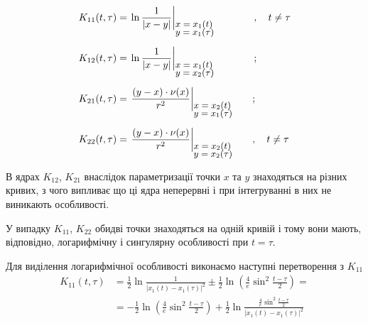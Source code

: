 \documentclass[14pt,a4paper]{extarticle}
\newcounter{e}
\numberwithin{equation}{section}
\begin{document}
$$
	\begin{array}{l}
		\displaystyle
		K_{11}(t, \tau) = \left.
			 \ln{\frac{1}{\abs{x - y}}}
		\right|_{
			{\small \parbox{20mm}{$ x = x_1(t)$ \\[-3pt] $y = x_1 ({\tau})$}}
		} \quad \quad, \quad t \neq \tau
		\\ [0.8cm]
		
		\displaystyle
		K_{12}(t, \tau) = \left.
			\ln{\frac{1}{\abs{x - y}}}
		\right|_{
			{\small \parbox{20mm}{$ x = x_1(t)$ \\[-3pt] $y = x_2 ({\tau})$}}
		} \quad \quad;
		\\ [0.8cm]
		
		\displaystyle
		K_{21}(t, \tau) = \left.
			\frac{(y - x) \cdot \nu(x)}{r^2}
		\right|_{
			{\small \parbox{20mm}{$ x = x_2(t)$ \\[-3pt] $y = x_1 ({\tau})$}}
		};
		\\ [0.8cm]
		
		\displaystyle
		K_{22}(t, \tau) = \left.
			\frac{(y - x) \cdot \nu(x)}{r^2}
		\right|_{
			{\small \parbox{20mm}{$ x = x_2(t)$ \\[-3pt] $y = x_2 ({\tau})$}}
		} 
		, \quad t \neq \tau
	\end{array}
$$

В ядрах $K_{12}$, $K_{21}$ внаслідок параметризації точки $x$ та $y$ знаходяться на різних кривих, з чого випливає що ці ядра неперервні і при інтегруванні в них не виникають особливості.

У випадку $K_{11}$, $K_{22}$ обидві точки знаходяться на одній кривій і тому вони мають, відповідно, логарифмічну і сингулярну особливості при $t = \tau$. 

Для  виділення логарифмічної особливості виконаємо наступні перетворення з $K_{11}$
$$
\begin{aligned}
	K_{11}(t, \tau) 
	&=
	\frac{1}{2} \ln \frac{1}{\left|x_{1}(t)-x_{1}(\tau)\right|^{2}} \pm \frac{1}{2} \ln \left(\frac{4}{e} \sin ^{2} \frac{t-\tau}{2}\right)=\\
	&=
	-\frac{1}{2} \ln \left(\frac{4}{e} \sin ^{2} \frac{t-\tau}{2}\right)+\frac{1}{2} \ln \frac{\frac{4}{e} \sin ^{2} \frac{t-\tau}{2}}{\left|x_{1}(t)-x_{1}(\tau)\right|^{2}}
\end{aligned}
$$
\end{document}
